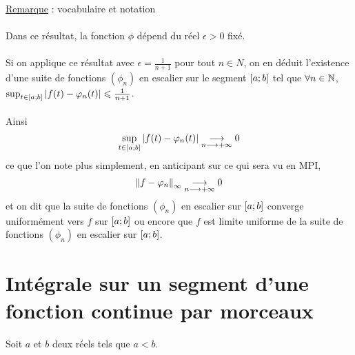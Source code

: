 \begin{dem}
\begin{itemize}
    \end{itemize}
    \underline{Remarque} : vocabulaire et notation\\~\\
    Dans ce résultat, la fonction \(\phi\) dépend du réel \(\epsilon > 0\) fixé.\\~\\
    Si on applique ce résultat avec \(\epsilon = \frac{1}{n + 1}\) pour tout \(n \in N\), on en déduit l’existence d’une suite de fonctions \((\phi_n)\) en escalier sur le segment \(\left[a;b\right]\) tel que \(\forall n \in \mathbb{N}\), \(\sup _{t\in\left[a;b\right]} \left\lvert f (t) - \varphi_n(t)\right\rvert \leqslant \frac{1}{n + 1}\).\\~\\
    Ainsi
    \[\sup_{t\in\left[a;b\right]}\left\lvert f (t) - \varphi_n(t)\right\rvert \underset{n\longrightarrow+\infty}{\longrightarrow} 0\]
    ce que l’on note plus simplement, en anticipant sur ce qui sera vu en MPI,
    \[\left\|f - \varphi_n\right\|_{\infty} \underset{n\longrightarrow+\infty}{\longrightarrow} 0\]
    et on dit que la suite de fonctions \((\phi_n)\) en escalier sur \(\left[a;b\right]\) converge uniformément vers \(f\) sur \(\left[a;b\right]\) ou encore que \(f\) est limite uniforme de la suite de fonctions \((\phi_n)\) en escalier sur \(\left[a;b\right]\).
\end{dem}
\section{Intégrale sur un segment d’une fonction continue par morceaux}
    Soit \(a\) et \(b\) deux réels tels que \(a < b\).
